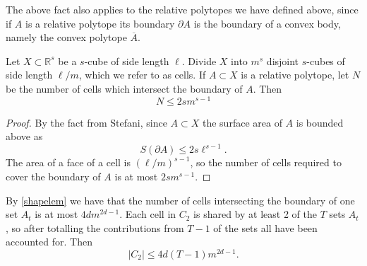 \documentclass{svproc}
\newcommand{\1}{\mathbbm{1}}
\newcommand{\rr}{\mathbb{R}}
\newcommand{\ol}[1]{\overline{#1}}
\begin{document}
\begin{remark}
The above fact also applies to the relative polytopes we have defined above, since if $A$ is a relative polytope its boundary $\partial A$ is the boundary of a convex body, namely the convex polytope $\ol{A}$.
\end{remark}

\begin{lemma}
Let $X\subset\rr^s$ be a $s$-cube of side length $\ell$. Divide $X$ into $m^s$ disjoint $s$-cubes of side length $\ell/m$, which we refer to as cells. If $A\subset X$ is a relative polytope, let $N$ be the number of cells which intersect the boundary of $A$. Then 
\begin{equation}\label{shapelem}
 N\leq 2s m^{s-1}
\end{equation}
\end{lemma}
\begin{proof}
By the fact from Stefani, since $A\subset X$ the surface area of $A$ is bounded above as
\begin{equation}S(\partial A)\leq 2s\ell^{s-1}.\end{equation}
The area of a face of a cell is $(\ell/m)^{s-1}$, so the number of cells required to cover the boundary of $A$ is at most $2s m^{s-1}$.
\end{proof}
By \cref{shapelem} we have that the number of cells intersecting the boundary of one set $A_t$ is at most $4d m^{2d-1}$. Each cell in $C_2$ is shared by at least 2 of the $T$ sets $A_t$, so after totalling the contributions from $T-1$ of the sets all have been accounted for. Then
\begin{equation}\label{c2bnd}
|C_2|\leq 4d(T-1)m^{2d-1}.
\end{equation}
\end{document}
